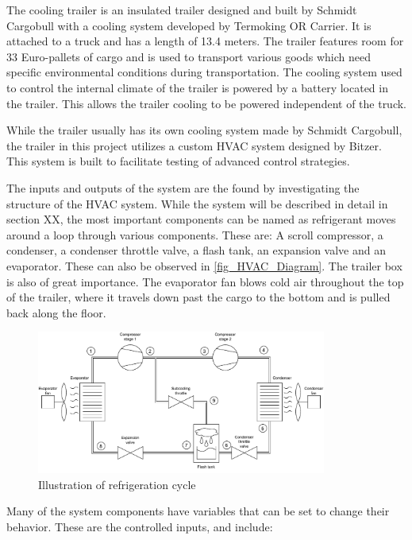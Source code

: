The cooling trailer is an insulated trailer designed and built by Schmidt Cargobull with a cooling system developed by Termoking OR Carrier. It is attached to a truck and has a length of 13.4 meters. The trailer features room for 33 Euro-pallets of cargo and is used to transport various goods which need specific environmental conditions during transportation. The cooling system used to control the internal climate of the trailer is powered by a battery located in the trailer. This allows the trailer cooling to be powered independent of the truck.

While the trailer usually has its own cooling system made by Schmidt Cargobull, the trailer in this project utilizes a custom HVAC system designed by Bitzer. This system is built to facilitate testing of advanced control strategies.

The inputs and outputs of the system are the found by investigating the structure of the HVAC system. While the system will be described in detail in section XX, the most important components can be named as refrigerant moves around a loop through various components. These are: A scroll compressor, a condenser, a condenser throttle valve, a flash tank, an expansion valve and an evaporator. These can also be observed in \cref{fig_HVAC_Diagram}. The trailer box is also of great importance. 
The evaporator fan blows cold air throughout the top of the trailer, where it travels down past the cargo to the bottom and is pulled back along the floor.

\begin{figure}[h!]
	\centering
	\includegraphics[width=0.85\textwidth]{Graphics/HVAC_Diagram_Fans.pdf}
	\caption{Illustration of refrigeration cycle}
	\label{fig:HVAC_Diagram}
\end{figure}

Many of the system components have variables that can be set to change their behavior. These are the controlled inputs, and include:

